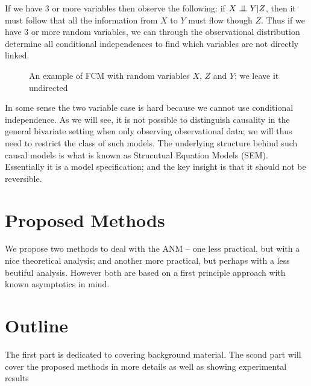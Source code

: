 If we have 3 or more variables then observe the following: if $X \bigCI Y | Z$, then it must follow that
all the information from $X$ to $Y$ must flow though $Z$. Thus if we have 3 or more random variables, we
can through the observational distribution determine all conditional independences to find which variables
are not directly linked. 

\begin{figure}[!h]
    \centering

    \caption{An example of FCM with random variables $X$, $Z$ and $Y$; we leave it undirected}
    \label{fig:conditionalIndep}

\end{figure}

In some sense the two variable case is hard because we cannot use conditional independence. As we will see, 
it is not possible to distinguish causality in the general bivariate setting when only observing 
observational data; we will thus need to restrict 
the class of such models. The underlying structure behind such causal models is what is known as 
Strucutual Equation Models (SEM). Essentially 
it is a model specification; and the key insight is that it should not be reversible. 


\section{Proposed Methods}

We propose two methods to deal with the ANM -- one less practical, but with a nice theoretical
analysis; and another more practical, but perhaps with a less beutiful analysis. However both
are based on a first principle approach with known asymptotics in mind.



\section{Outline}

The first part is dedicated to covering background material. The scond part will cover the 
proposed methods in more details as well as showing experimental results

